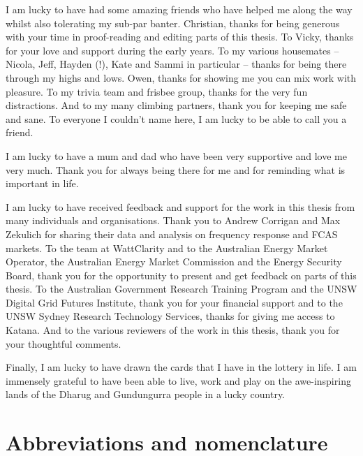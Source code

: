 \documentclass[12pt,a4paper,]{report}
\begin{document}
I am lucky to have had some amazing friends who have helped me along the
way whilst also tolerating my sub-par banter. Christian, thanks for
being generous with your time in proof-reading and editing parts of this
thesis. To Vicky, thanks for your love and support during the early
years. To my various housemates -- Nicola, Jeff, Hayden (!), Kate and
Sammi in particular -- thanks for being there through my highs and lows.
Owen, thanks for showing me you can mix work with pleasure. To my trivia
team and frisbee group, thanks for the very fun distractions. And to my
many climbing partners, thank you for keeping me safe and sane. To
everyone I couldn't name here, I am lucky to be able to call you a
friend.

I am lucky to have a mum and dad who have been very supportive and love
me very much. Thank you for always being there for me and for reminding
what is important in life.

I am lucky to have received feedback and support for the work in this
thesis from many individuals and organisations. Thank you to Andrew
Corrigan and Max Zekulich for sharing their data and analysis on
frequency response and FCAS markets. To the team at WattClarity and to
the Australian Energy Market Operator, the Australian Energy Market
Commission and the Energy Security Board, thank you for the opportunity
to present and get feedback on parts of this thesis. To the Australian
Government Research Training Program and the UNSW Digital Grid Futures
Institute, thank you for your financial support and to the UNSW Sydney
Research Technology Services, thanks for giving me access to Katana. And
to the various reviewers of the work in this thesis, thank you for your
thoughtful comments.

Finally, I am lucky to have drawn the cards that I have in the lottery
in life. I am immensely grateful to have been able to live, work and
play on the awe-inspiring lands of the Dharug and Gundungurra people in
a lucky country. \newpage


\tableofcontents

\newpage

\listoffigures

\newpage

\listoftables

\newpage

\hypertarget{abbreviations-and-nomenclature}{%
\chapter*{Abbreviations and
nomenclature}\label{abbreviations-and-nomenclature}}
\end{document}
